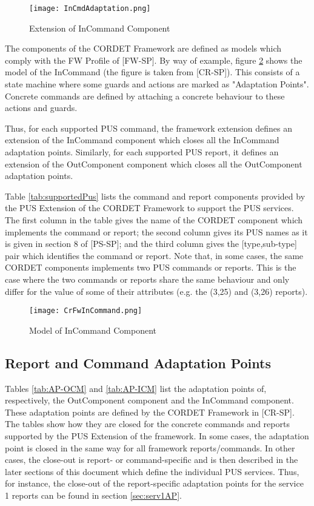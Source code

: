 \documentclass{pnp_article}
\begin{document}
\begin{figure}[H]
 \centering
 \texttt{[image: InCmdAdaptation.png]}
 \caption{Extension of InCommand Component}
 \label{fig:InCmdAdaptation}
\end{figure}

The components of the CORDET Framework are defined as models which comply with the FW Profile of [FW-SP]. By way of example, figure \ref{fig:CrFwInCommand} shows the model of the InCommand (the figure is taken from [CR-SP]). This consists of a state machine where some guards and actions are marked as "Adaptation Points". Concrete commands are defined by attaching a concrete behaviour to these actions and guards.

Thus, for each supported PUS command, the framework extension defines an extension of the InCommand component which closes all the InCommand adaptation points. Similarly, for each supported PUS report, it defines an extension of the OutComponent component which closes all the OutComponent adaptation points.

Table \ref{tab:supportedPus} lists the command and report components provided by the PUS Extension of the CORDET Framework to support the PUS services. The first column in the table gives the name of the CORDET component which implements the command or report; the second column gives its PUS names as it is given in section 8 of [PS-SP]; and the third column gives the [type,sub-type] pair which identifies the command or report. Note that, in some cases, the same CORDET components implements two PUS commands or reports. This is the case where the two commands or reports share the same behaviour and only differ for the value of some of their attributes (e.g. the (3,25) and (3,26) reports).

\begin{figure}[H]
 \centering
 \texttt{[image: CrFwInCommand.png]}
 \caption{Model of InCommand Component}
 \label{fig:CrFwInCommand}
\end{figure}


\subsection{Report and Command Adaptation Points}\label{sec:repCmdAP}
Tables \ref{tab:AP-OCM} and \ref{tab:AP-ICM} list the adaptation points of, respectively, the OutComponent component and the InCommand component. These adaptation points are defined by the CORDET Framework in [CR-SP]. The tables show how they are closed for the concrete commands and reports supported by the PUS Extension of the framework. In some cases, the adaptation point is closed in the same way for all framework reports/commands. In other cases, the close-out is report- or command-specific and is then described in the later sections of this document which define the individual PUS services. Thus, for instance, the close-out of the report-specific adaptation points for the service 1 reports can be found in section \ref{sec:serv1AP}. 
\end{document}

